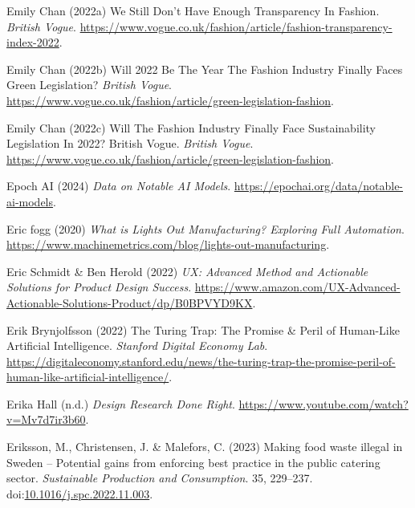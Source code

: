 \documentclass[
  letterpaper,
  DIV=11,
  numbers=noendperiod]{scrartcl}
\newlength{\cslhangindent}
\newenvironment{CSLReferences}[2] %
 {\begin{list}{}{%
  \setlength{\itemindent}{0pt}
  \setlength{\leftmargin}{0pt}
  \setlength{\parsep}{0pt}
  \ifodd #1
   \setlength{\leftmargin}{\cslhangindent}
   \setlength{\itemindent}{-1\cslhangindent}
  \fi
  \setlength{\itemsep}{#2\baselineskip}}}
 {\end{list}}
\begin{document}
\begin{CSLReferences}{0}{1}
Emily Chan (2022a) We {Still Don}'t {Have Enough Transparency In
Fashion}. \emph{British Vogue}.
\url{https://www.vogue.co.uk/fashion/article/fashion-transparency-index-2022}.

Emily Chan (2022b) Will 2022 {Be The Year The Fashion Industry Finally
Faces Green Legislation}? \emph{British Vogue}.
\url{https://www.vogue.co.uk/fashion/article/green-legislation-fashion}.

Emily Chan (2022c) Will {The Fashion Industry Finally Face
Sustainability Legislation In} 2022? {\textbar} {British Vogue}.
\emph{British Vogue}.
\url{https://www.vogue.co.uk/fashion/article/green-legislation-fashion}.

Epoch AI (2024) \emph{Data on {Notable AI Models}}.
\url{https://epochai.org/data/notable-ai-models}.

Eric fogg (2020) \emph{What is {Lights Out Manufacturing}? {Exploring
Full Automation}}.
\url{https://www.machinemetrics.com/blog/lights-out-manufacturing}.

Eric Schmidt \& Ben Herold (2022) \emph{{UX}: {Advanced Method} and
{Actionable Solutions} for {Product Design Success}}.
\url{https://www.amazon.com/UX-Advanced-Actionable-Solutions-Product/dp/B0BPVYD9KX}.

Erik Brynjolfsson (2022) The {Turing Trap}: {The Promise} \& {Peril} of
{Human-Like Artificial Intelligence}. \emph{Stanford Digital Economy
Lab}.
\url{https://digitaleconomy.stanford.edu/news/the-turing-trap-the-promise-peril-of-human-like-artificial-intelligence/}.

Erika Hall (n.d.) \emph{Design {Research Done Right}}.
\url{https://www.youtube.com/watch?v=Mv7d7ir3b60}.

Eriksson, M., Christensen, J. \& Malefors, C. (2023) Making food waste
illegal in {Sweden} -- {Potential} gains from enforcing best practice in
the public catering sector. \emph{Sustainable Production and
Consumption}. 35, 229--237.
doi:\href{https://doi.org/10.1016/j.spc.2022.11.003}{10.1016/j.spc.2022.11.003}.


\end{CSLReferences}
\end{document}
